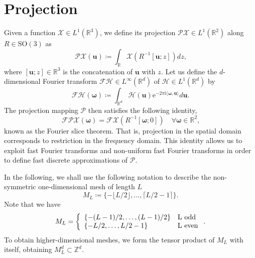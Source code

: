 \documentclass{article}
\newcommand{\euler}{\mathrm{e}}
\newcommand{\imunit}{\mathrm{i}}
\newcommand{\Integer}{\mathbb Z}
\newcommand{\Real}{\mathbb R}
\newcommand{\SO}{\mathrm{SO}}
\newcommand{\meshu}{M}
\newcommand{\volfun}{\mathcal{X}}
\newcommand{\projfun}{\mathcal{P}}
\newcommand{\vu}{\boldsymbol{u}}
\newcommand{\vomega}{\boldsymbol{\omega}}
\newcommand{\rot}{R}
\newcommand{\fourier}[1]{\mathcal{F}#1}
\begin{document}
\section{Projection}

Given a function $\volfun \in L^1(\Real^3)$, we define its projection $\projfun \volfun \in L^1(\Real^2)$ along $\rot \in \SO(3)$ as
\begin{equation}
	\projfun \volfun(\vu) \coloneqq \int_\Real \volfun(\rot^{-1} [\vu; z]) dz\mbox{,}
\end{equation}
where $[\vu; z] \in \Real^3$ is the concatenation of $\vu$ with $z$.
Let us define the $d$-dimensional Fourier transform $\fourier{\mathcal{H}} \in L^\infty(\Real^d)$ of $\mathcal{H} \in L^1(\Real^d)$ by
\begin{equation}
    \fourier{\mathcal{H}}(\vomega) \coloneqq \int_{\Real^d} \mathcal{H}(\vu) \euler^{-2\pi\imunit \langle \vomega, \vu \rangle} d\vu\mbox{.}
\end{equation}
The projection mapping $\projfun$ then satisfies the following identity,
\begin{equation}
	\label{eq:fourier-slice}
    \fourier{\projfun \volfun}(\vomega) = \fourier{\volfun}\left(\rot^{-1}[\vomega; 0]\right) \quad \forall \vomega \in \Real^2 \mbox{,}
\end{equation}
known as the Fourier slice theorem.
That is, projection in the spatial domain corresponds to restriction in the frequency domain.
This identity allows us to exploit fast Fourier transforms and non-uniform fast Fourier transforms in order to define fast discrete approximations of $\projfun$.

In the following, we shall use the following notation to describe the non-symmetric one-dimensional mesh of length $L$
\begin{equation}
    \meshu_L \coloneqq \{-\lfloor L/2 \rfloor, \ldots, \lceil L/2-1 \rceil\}\mbox{.}
\end{equation}
Note that we have
\begin{equation}
	\meshu_L =
	\left\{
	\begin{array}{ll}
		\{-(L-1)/2, \ldots, (L-1)/2\} & $L$ \mbox{~odd} \\
		\{-L/2, \ldots, L/2-1\} & $L$ \mbox{~even}
	\end{array}
	\right.
	\mbox{.}
\end{equation}
To obtain higher-dimensional meshes, we form the tensor product of $\meshu_L$ with itself, obtaining $\meshu_L^d \subset \Integer^d$.
\end{document}
